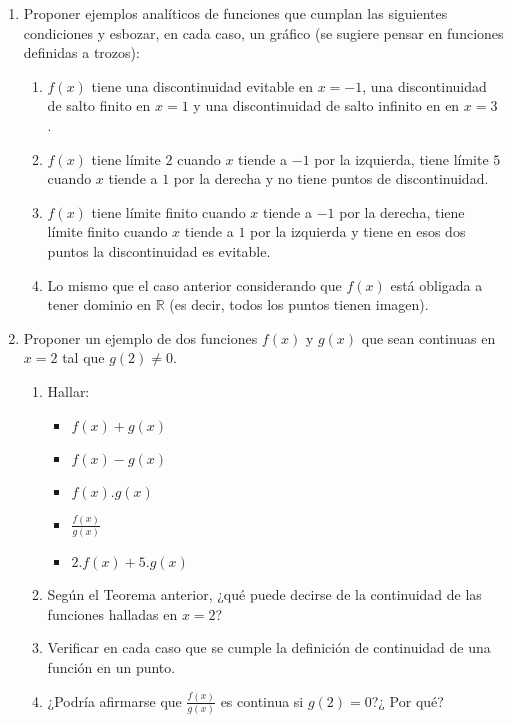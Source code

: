 \documentclass[12pt]{article}
\newtheorem*{myteo}{Teorema} %
\theoremstyle{definition}
\begin{document}
\begin{enumerate}
\item Proponer ejemplos analíticos de funciones que cumplan las siguientes condiciones y esbozar, en cada caso, un gráfico (se sugiere pensar en funciones definidas a trozos):
\begin{enumerate}
\item $f(x)$ tiene  una discontinuidad evitable en $x = -1$, una discontinuidad de salto finito en $x = 1$ y una discontinuidad de salto infinito en en $x = 3$ .
\item $f(x)$ tiene límite $2$ cuando $x$ tiende a $-1$  por la izquierda, tiene límite $5$ cuando $x$ tiende a $1$ por la derecha y no tiene puntos de discontinuidad.
\item $f(x)$ tiene límite finito cuando $x$ tiende a $-1$ por la derecha, tiene límite finito cuando $x$ tiende a $1$ por la izquierda y tiene en esos dos puntos la discontinuidad es evitable.
\item Lo mismo que el caso anterior considerando que $f(x)$ está obligada a tener dominio en  $\mathbb{R}$  (es decir, todos los puntos tienen imagen).
\end{enumerate}


\vspace{0.3 cm}


\item Proponer un ejemplo de dos funciones $f(x)$ y $g(x)$ que sean continuas en $x = 2$ tal que $g(2) \neq 0$. 
\begin{enumerate}
\item Hallar:
\begin{multicols}{3}
\begin{itemize}
\item $f(x) + g(x)$
\item $f(x) - g(x)$
\item $f(x).g(x)$
\item $\frac{f(x)}{g(x)}$ 
\item $2.f(x) + 5.g(x)$
\end{itemize}
\end{multicols}
\item Según el Teorema anterior, ¿qué puede decirse de la continuidad de las funciones halladas en $x=2$?
\item Verificar en cada caso que se cumple la definición de continuidad de una función en un punto.
\item ¿Podría afirmarse que $\frac{f(x)}{g(x)}$  es continua si $g(2) = 0$?¿ Por qué?
\end{enumerate}



\end{enumerate}
\end{document}
